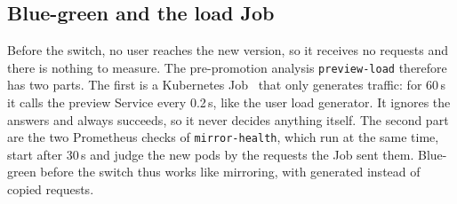 \subsection{Blue-green and the load Job}
\label{sec:ImplBlueGreen}
Before the switch, no user reaches the new version, so it receives no requests and there is nothing to measure. The pre-promotion analysis \texttt{preview-load} therefore has two parts. The first is a Kubernetes Job~\cite{ArgoRolloutsJob} that only generates traffic: for 60\,s it calls the preview Service every 0.2\,s, like the user load generator. It ignores the answers and always succeeds, so it never decides anything itself. The second part are the two Prometheus checks of \texttt{mirror-health}, which run at the same time, start after 30\,s and judge the new pods by the requests the Job sent them. Blue-green before the switch thus works like mirroring, with generated instead of copied requests.




